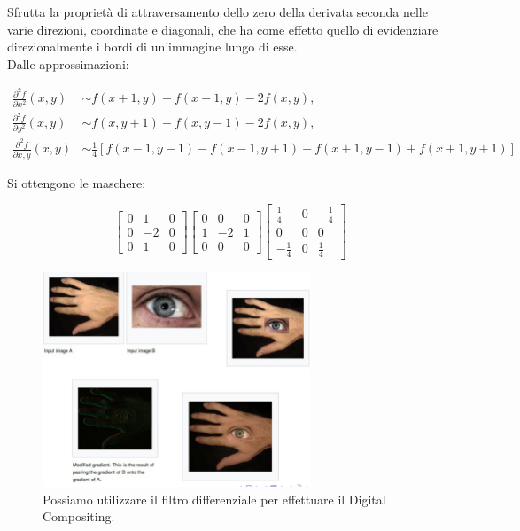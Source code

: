 Sfrutta la proprietà di attraversamento dello zero della derivata seconda nelle
varie direzioni, coordinate e diagonali, che ha come effetto quello di
evidenziare direzionalmente i bordi di un'immagine lungo di esse. \\Dalle
approssimazioni:

\begin{align*}
    \frac{\partial^2{f}}{\partial{x}^2}(x,y) & \sim f(x+1,y)+f(x-1,y)-2f(x,y),                                \\
    \frac{\partial^2{f}}{\partial{y}^2}(x,y) & \sim f(x,y+1)+f(x,y-1)-2f(x,y),                                \\
    \frac{\partial^2{f}}{\partial{x,y}}(x,y) & \sim \frac{1}{4}[f(x-1,y-1)-f(x-1,y+1)-f(x+1,y-1)+f(x+1, y+1)]
\end{align*}

Si ottengono le maschere:
\begin{center}
    \[
        \begin{bmatrix}
            0 & 1  & 0 \\
            0 & -2 & 0 \\
            0 & 1  & 0
        \end{bmatrix}
        \begin{bmatrix}
            0 & 0  & 0 \\
            1 & -2 & 1 \\
            0 & 0  & 0
        \end{bmatrix}
        \begin{bmatrix}
            \frac{1}{4}  & 0 & -\frac{1}{4} \\
            0            & 0 & 0            \\
            -\frac{1}{4} & 0 & \frac{1}{4}
        \end{bmatrix}
    \]
\end{center}

\begin{figure}[H]
    \centering
    \includegraphics[width=8cm, keepaspectratio]{capitoli/immagini/imgs/digital-composing.png}
    \caption{Possiamo utilizzare il filtro differenziale per effettuare il Digital Compositing.}
\end{figure}

